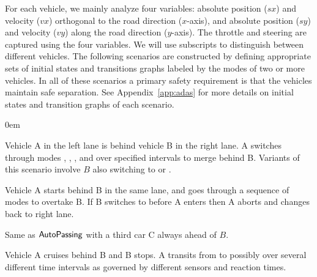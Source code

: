 For each vehicle, we mainly analyze four variables: absolute position
($sx$) and velocity ($vx$) orthogonal to the road direction
($x$-axis), and absolute position ($sy$) and velocity ($vy$) along the
road direction ($y$-axis). The throttle and steering are captured using
the four variables. We will use subscripts to distinguish between
different vehicles.  The following scenarios are constructed by
defining appropriate sets of initial states and transitions graphs
labeled by the modes of two or more vehicles. In all of these
scenarios a primary safety requirement is that the vehicles maintain
safe separation. See Appendix~\ref{app:adas} for more details on
initial states and transition graphs of each scenario.
\begin{description} 
\itemsep0em 
\item[$\auto{Merge}$:] 
Vehicle A in the left lane is behind   vehicle B  in the right lane. A switches through modes  , , , and  over  specified intervals to merge behind B.
Variants of this scenario involve $B$ also switching to  or .
%
\item[$\auto{AutoPassing}$:]
Vehicle A starts behind  B in the same lane, and  goes through a sequence of modes to  overtake B. If B switches to  before A enters  then A aborts and changes back to right lane. 
\item[$\auto{Merge3}$:]
Same as $\auto{AutoPassing}$ with a third car C always ahead of $B$.
\item[$\auto{AEB}$:]
Vehicle A cruises behind B and B stops.
A transits from  to  possibly over several different time intervals as governed by different sensors and reaction times.

\end{description}






 
